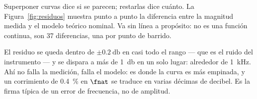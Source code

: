 Superponer curvas dice si se parecen; restarlas dice cuánto. La
Figura~\ref{fig:residuos} muestra punto a punto la diferencia entre la magnitud
medida y el modelo teórico nominal. Va sin línea a propósito: no es una función
continua, son 37 diferencias, una por punto de barrido.

El residuo se queda dentro de $\pm\SI{0.2}{\decibel}$ en casi todo el rango
--- que es el ruido del instrumento --- y se dispara a más de
\SI{1}{\decibel} en un solo lugar: alrededor de \SI{1}{\kilo\hertz}. Ahí no
falla la medición, falla el modelo: es donde la curva es más empinada, y un
corrimiento de \SI{0.4}{\percent} en $\fnat$ se traduce en varias décimas de
decibel. Es la firma típica de un error de frecuencia, no de amplitud.
